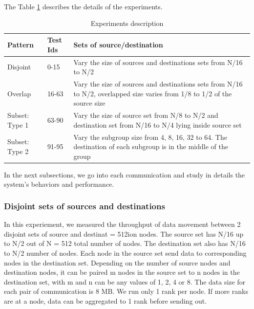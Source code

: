 The Table \ref{tbl:experiment} describes the details of the experiments.

\begin{table}[h]
\begin{center}
    \begin{tabular}{ | p{1cm} | l | p{5cm} |}
    \hline
    Pattern & Test Ids & Sets of source/destination \\ \hline
    Disjoint & 0-15 & Vary the size of sources and destinations sets from N/16 to N/2 \\ \hline
    Overlap & 16-63 & Vary the size of sources and destinations sets from N/16 to N/2, overlapped size varies from 1/8 to 1/2 of the source size \\ \hline
    Subset: Type 1 & 63-90 & Vary the size of source set from N/8 to N/2 and destination set from N/16 to N/4 lying inside source set \\ \hline
    Subset: Type 2 & 91-95 & Vary the subgroup size from 4, 8, 16, 32 to 64. The destination of each subgroup is in the middle of the group \\
    \hline
    \end{tabular}

    \caption{Experiments description}
    \label{tbl:experiment}

\end{center}
\end{table}

In the next subsections, we go into each communication and study in details the system's behaviors and performance.

\subsubsection{Disjoint sets of sources and destinations}

In this experiement, we measured the throughput of data movement between 2 disjoint sets of source and destinat = 512ion nodes. The source set has N/16 up to N/2 out of N = 512 total number of nodes. The destination set also has N/16 to N/2 number of nodes. Each node in the source set send data to corresponding nodes in the destination set. Depending on the number of source nodes and destination nodes, it can be paired m nodes in the source set to n nodes in the destination set, with m and n can be any values of 1, 2, 4 or 8. The data size for each pair of communication is 8 MB. We run only 1 rank per node. If more ranks are at a node, data can be aggregated to 1 rank before sending out.

